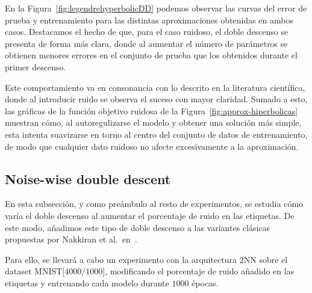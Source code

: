 En la Figura~\ref{fig:legendrehyperbolicDD} podemos observar las curvas del error de prueba y entrenamiento para las distintas aproximaciones obtenidas en ambos casos. Destacamos el hecho de que, para el caso ruidoso, el doble descenso se presenta de forma más clara, donde al aumentar el número de parámetros se obtienen menores errores en el conjunto de prueba que los obtenidos durante el primer descenso.\newline

Este comportamiento va en consonancia con lo descrito en la literatura científica, donde al introducir ruido se observa el suceso con mayor claridad. Sumado a esto, las gráficas de la función objetivo ruidosa de la Figura~\ref{fig:approx-hiperbolicas} muestran cómo, al autoregulizarse el modelo y obtener una solución más simple, esta intenta suavizarse en torno al centro del conjunto de datos de entrenamiento, de modo que cualquier dato ruidoso no afecte excesivamente a la aproximación.\newline

\subsection{Noise-wise double descent}\label{subsec:noise-wise-dd}

En esta subsección, y como preámbulo al resto de experimentos, se estudia cómo varía el doble descenso al aumentar el porcentaje de ruido en las etiquetas. De este modo, añadimos este tipo de doble descenso a las variantes clásicas propuestas por Nakkiran et al.\ en~\cite{Nakkiran2019}.\newline

Para ello, se llevará a cabo un experimento con la arquitectura $2$NN sobre el dataset MNIST[$4000/1000$], modificando el porcentaje de ruido añadido en las etiquetas y entrenando cada modelo durante $1000$ épocas.\newline

